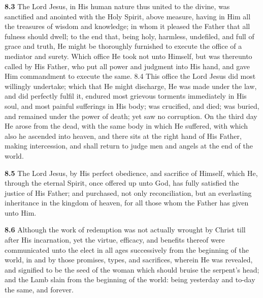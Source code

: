 \par\textbf{8.3} The Lord Jesus, in His human nature thus united to the divine, was sanctified and anointed with the Holy Spirit, above measure, having in Him all the treasures of wisdom and knowledge; in whom it pleased the Father that all fulness should dwell; to the end that, being holy, harmless, undefiled, and full of grace and truth, He might be thoroughly furnished to execute the office of a mediator and surety. Which office He took not unto Himself, but was thereunto called by His Father, who put all power and judgment into His hand, and gave Him commandment to execute the same.  8.4 This office the Lord Jesus did most willingly undertake; which that He might discharge, He was made under the law, and did perfectly fulfil it, endured most grievous torments immediately in His soul, and most painful sufferings in His body; was crucified, and died; was buried, and remained under the power of death; yet saw no corruption. On the third day He arose from the dead, with the same body in which He suffered, with which also he ascended into heaven, and there sits at the right hand of His Father, making intercession, and shall return to judge men and angels at the end of the world.   

\par\textbf{8.5} The Lord Jesus, by His perfect obedience, and sacrifice of Himself, which He, through the eternal Spirit, once offered up unto God, has fully satisfied the justice of His Father; and purchased, not only reconciliation, but an everlasting inheritance in the kingdom of heaven, for all those whom the Father has given unto Him.   

\par\textbf{8.6} Although the work of redemption was not actually wrought by Christ till after His incarnation, yet the virtue, efficacy, and benefits thereof were communicated unto the elect in all ages successively from the beginning of the world, in and by those promises, types, and sacrifices, wherein He was revealed, and signified to be the seed of the woman which should bruise the serpent{}'s head; and the Lamb slain from the beginning of the world: being yesterday and to-day the same, and forever.   

